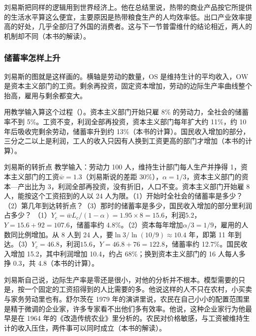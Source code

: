 刘易斯把同样的逻辑用到世界经济上。他在总结里说，热带的商业产品按它所提供的生活水平算这么便宜，主要原因是热带粮食生产的人均效率低\cite{lewis1954}。出口产业效率提高的好处，几乎全部归了外国的消费者\cite{lewis1954}。这与下一节普雷维什的结论相近，两人的机制却不同（本书的解读）。

\subsubsection{储蓄率怎样上升}

刘易斯的图就是这样画的\cite{lewis1954}。横轴是劳动的数量，OS 是维持生计的平均收入，OW 是资本主义部门的工资。剩余再投资，固定资本增加，劳动的边际生产率曲线整个抬高，雇用与剩余都变大\cite{lewis1954}。

用教学输入算这个过程（）。资本主义部门开始只雇 8\% 的劳动力，全社会的储蓄率不到 5\%。工资不变，利润全部再投资，资本主义部门每年扩大约 11\%，约 10 年后吸收完剩余劳动，储蓄率升到约 13\%（本书的计算）。国民收入增加的部分，三分之二以上是利润，工人的收入只因有人换到工资更高的部门才增加（本书的计算）。

\begin{example}{刘易斯的转折点}\label{ex:development-lewis}
教学输入：劳动力 100 人，维持生计部门每人生产并挣得 1，资本主义部门的工资$\bar w=1.3$（刘易斯说的差距 30\%），$\alpha=1/3$，资本主义部门的资本—产出比为 3，利润全部再投资，没有折旧，人口不变。资本主义部门开始雇 8 人，能按这个工资招到的人以 24 人为限。（1）开始时全社会的储蓄率是多少？（2）第几年到达转折点？（3）那时的储蓄率是多少，国民收入增加的部分里利润占多少？
\solution
（1）$Y_c=\bar w L_c/(1-\alpha)=1.95\times8=15.6$，利润$5.2$，$Y=15.6+92=107.6$，储蓄率约 4.8\%。（2）资本每年增加$\alpha/3=1/9$，雇用的人数同比例增加。从 8 人到 24 人，要$\ln3/\ln(10/9)\approx10.4$ 年，即第 11 年到达。（3）$Y_c=46.8$，利润$15.6$，$Y=46.8+76=122.8$，储蓄率约 12.7\%。国民收入增加 15.2，其中利润增加 10.4，约占 68\%；换到资本主义部门的 16 人每人多挣 0.3，共 4.8（本书的计算）。
\end{example}


\begin{pitfall}[劳动过剩就是农业劳动的边际产品为零]
刘易斯自己说，边际生产率是零还是很小，对他的分析并不根本\cite{lewis1954}。模型需要的只是，按一个固定的工资招得到的人比需要的多。他说这样的人不只在农村，小买卖与家务劳动里也有\cite{lewis1954}。舒尔茨在 1979 年的演讲里说，农民在自己小小的配置范围里是精于微调的企业家，许多专家看不出他们多有效率\cite{schultz1979}。他说，这种企业家行为他最早是在 1964 年的《改造传统农业》里分析的\cite{schultz1979}。农民对价格敏感，与工资被维持生计的收入压住，两件事可以同时成立（本书的解读）。
\end{pitfall}

